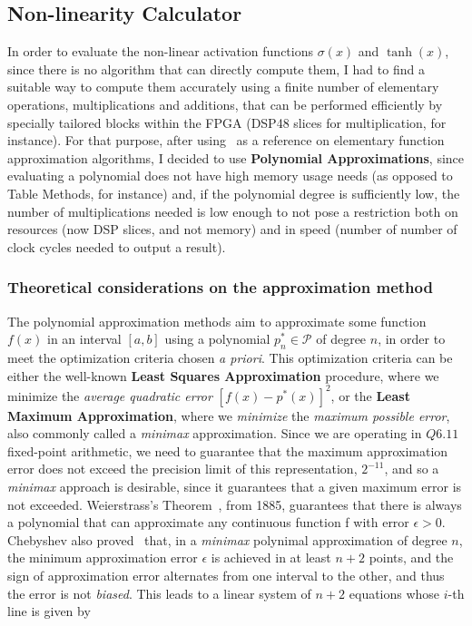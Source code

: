 \subsection{Non-linearity Calculator}\label{sec:nonlincalc}
In order to evaluate the non-linear activation functions $\sigma(x)$ and $\tanh(x)$, since there is no algorithm that can directly compute them, I had to find a suitable way to compute them accurately using a finite number of elementary operations, multiplications and additions, that can be performed efficiently by specially tailored blocks within the FPGA (DSP48 slices for multiplication, for instance). For that purpose, after using~\cite{Muller05} as a reference on elementary function approximation algorithms, I decided to use \textbf{Polynomial Approximations}, since evaluating a polynomial does not have high memory usage needs (as opposed to Table Methods, for instance) and, if the polynomial degree is sufficiently low, the number of multiplications needed is low enough to not pose a restriction both on resources (now DSP slices, and not memory) and in speed (number of number of clock cycles needed to output a result).

\subsubsection{Theoretical considerations on the approximation method}
The polynomial approximation methods aim to approximate some function $f(x)$ in an interval $\left[a, b\right]$ using a polynomial $p^*_n \in \mathcal{P}$ of degree $n$, in order to meet the optimization criteria chosen \textit{a priori}. This optimization criteria can be either the well-known \textbf{Least Squares Approximation} procedure, where we minimize the \emph{average quadratic error} $\left[f(x)-p^*(x)\right]^2$, or the \textbf{Least Maximum Approximation}, where we \emph{minimize} the \emph{maximum possible error}, also commonly called a \textit{minimax} approximation. Since we are operating in $Q6.11$ fixed-point arithmetic, we need to guarantee that the maximum approximation error does not exceed the precision limit of this representation, $2^{-11}$, and so a \textit{minimax} approach is desirable, since it guarantees that a given maximum error is not exceeded. Weierstrass's Theorem~\cite{Weierstrass1885}, from 1885, guarantees that there is always a polynomial that can approximate any continuous function f with error $\epsilon > 0$. Chebyshev also proved~\cite{Muller05} that, in a \textit{minimax} polynimal approximation of degree $n$, the minimum approximation error $\epsilon$ is achieved in at least $n+2$ points, and the sign of approximation error alternates from one interval to the other, and thus the error is not \emph{biased}. This leads to a linear system of $n+2$ equations whose $i$-th line is given by 

